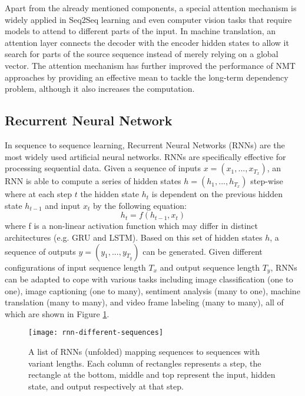 Apart from the already mentioned components, a special attention mechanism is widely applied in Seq2Seq learning and even computer vision tasks that require models to attend to different parts of the input. In machine translation, an attention layer connects the decoder with the encoder hidden states to allow it search for parts of the source sequence instead of merely relying on a global vector. The attention mechanism has further improved the performance of NMT approaches by providing an effective mean to tackle the long-term dependency problem, although it also increases the computation.


\subsection{Recurrent Neural Network} \label{subsection:rnn}
In sequence to sequence learning, Recurrent Neural Networks (RNNs) are the most widely used artificial neural networks. RNNs are specifically effective for processing sequential data. Given a sequence of inputs $ x = (x_{1},...,x_{T_{x}}) $, an RNN is able to compute a series of hidden states $ h = (h_{1},...,h_{T_{x}}) $ step-wise where at each step $ t $ the hidden state $ h_{t} $ is dependent on the previous hidden state $ h_{t-1} $ and input $ x_{t} $ by the following equation:
\begin{equation} \label{equation:rnn hidden state}
h_{t} = f(h_{t-1}, x_{t})
\end{equation}
where f is a non-linear activation function which may differ in distinct architectures (e.g. GRU and LSTM). Based on this set of hidden states $ h $, a sequence of outputs $ y = (y_{1},...,y_{T_{y}}) $ can be generated. Given different configurations of input sequence length $ T_{x} $ and output sequence length $ T_{y} $, RNNs can be adapted to cope with various tasks including image classification (one to one), image captioning (one to many), sentiment analysis (many to one), machine translation (many to many), and video frame labeling (many to many), all of which are shown in Figure \ref{figure:rnn different sequences}.

\begin{figure}[h]
\texttt{[image: rnn-different-sequences]}
\centering
\caption{A list of RNNs (unfolded) mapping sequences to sequences with variant lengths. Each column of rectangles represents a step, the rectangle at the bottom, middle and top represent the input, hidden state, and output respectively at that step.}
\label{figure:rnn different sequences}
\end{figure}

